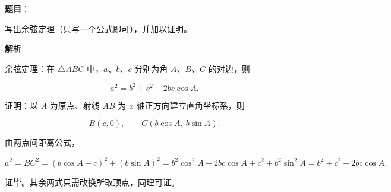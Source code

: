 \begin{answer}

\textbf{题目}：

写出余弦定理（只写一个公式即可），并加以证明。

\textbf{解析}

余弦定理：在 $\triangle ABC$ 中，$a$、$b$、$c$ 分别为角 $A$、$B$、$C$ 的对边，则

\nopagebreak[4]
\[
a^2=b^2+c^2-2bc\cos A.
\]

证明：以 $A$ 为原点、射线 $AB$ 为 $x$ 轴正方向建立直角坐标系，则

\nopagebreak[4]
\[
B(c,0),\qquad C(b\cos A,\ b\sin A).
\]

由两点间距离公式，

\nopagebreak[4]
\[
a^2=BC^2=(b\cos A-c)^2+(b\sin A)^2
=b^2\cos^2A-2bc\cos A+c^2+b^2\sin^2A
=b^2+c^2-2bc\cos A.
\]

证毕。其余两式只需改换所取顶点，同理可证。


\end{answer}
